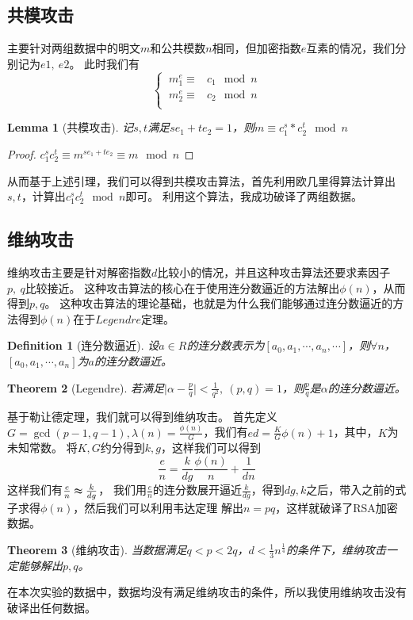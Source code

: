\documentclass{ctexart}
\newtheorem{theorem}{Theorem}
\newtheorem{lemma}[theorem]{Lemma}
\newtheorem{definition}{Definition}
\begin{document}
\subsection{共模攻击}
主要针对两组数据中的明文$m$和公共模数$n$相同，但加密指数$e$互素的情况，我们分别记为$e1,\ e2$。
此时我们有
\begin{equation*}
    \begin{cases}
    \ m^e_1\equiv& c_1 \mod n\\
    \ m^e_2\equiv& c_2  \mod n \\
    \end{cases} 
\end{equation*}
\begin{lemma}[共模攻击]
    记$s,t$满足$se_1+te_2=1$，则$m\equiv c_1^s*c_2^t\mod n$
\end{lemma}
\begin{proof}
    $c_1^sc_2^t\equiv m^{se_1+te_2}\equiv m \mod n$
\end{proof}
从而基于上述引理，我们可以得到共模攻击算法，首先利用欧几里得算法计算出$s,t$，计算出$c_1^sc_2^t\mod n$即可。
利用这个算法，我成功破译了两组数据。
\subsection{维纳攻击}
维纳攻击主要是针对解密指数$d$比较小的情况，并且这种攻击算法还要求素因子$p,\ q$比较接近。
这种攻击算法的核心在于使用连分数逼近的方法解出$\phi(n)$，从而得到$p,q$。
这种攻击算法的理论基础，也就是为什么我们能够通过连分数逼近的方法得到$\phi(n)$在于$Legendre$定理。
\begin{definition}[连分数逼近]
    设$a\in R$的连分数表示为$[a_0,a_1,\cdots,a_n,\cdots]$，则$\forall n$，$[a_0,a_1,\cdots,a_n]$为$a$的连分数逼近。
\end{definition}
\begin{theorem}[Legendre]
    若满足$\vert\alpha-\frac{p}{q}\vert<\frac{1}{q^2},\ (p,q)=1$，则$\frac{p}{q}$是$\alpha$的连分数逼近。
\end{theorem}
基于勒让德定理，我们就可以得到维纳攻击。
首先定义$G=\gcd(p-1,q-1), \lambda(n)=\frac{\phi(n)}{G}$，我们有$ed=\frac{K}{G}\phi(n)+1$，其中，$K$为未知常数。
将$K,G$约分得到$k,g$，这样我们可以得到
$$
\frac{e}{n}=\frac{k}{dg}\frac{\phi(n)}{n}+\frac{1}{dn}
$$
这样我们有$\frac{e}{n}\thickapprox \frac{k}{dg}$，
我们用$\frac{e}{n}$的连分数展开逼近$\frac{k}{dg}$，得到$dg,k$之后，带入之前的式子求得$\phi(n)$，然后我们可以利用韦达定理
解出$n=pq$，这样就破译了RSA加密数据。
\begin{theorem}[维纳攻击]
    当数据满足$q<p<2q$，$d<\frac{1}{3}n^{\frac{1}{4}}$的条件下，维纳攻击一定能够解出$p,q$。
\end{theorem}
在本次实验的数据中，数据均没有满足维纳攻击的条件，所以我使用维纳攻击没有破译出任何数据。
\end{document}
